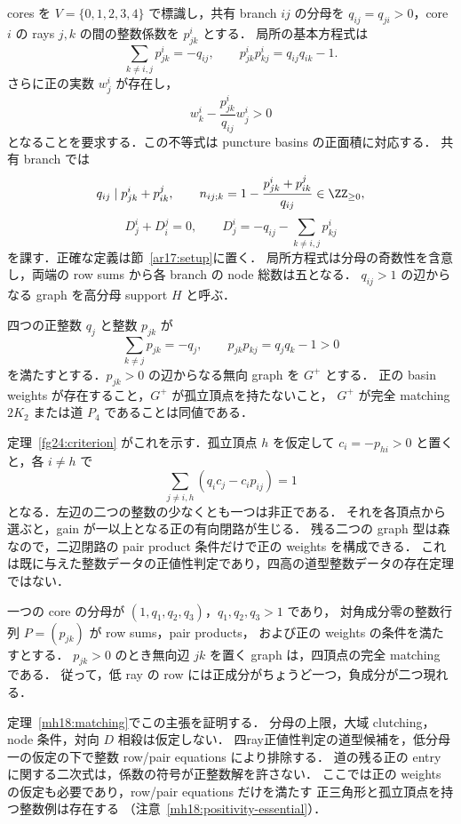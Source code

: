 cores を $V=\{0,1,2,3,4\}$ で標識し，共有 branch $ij$ の分母を
$q_{ij}=q_{ji}>0$，core $i$ の rays $j,k$ の間の整数係数を $p^i_{jk}$ とする．
局所の基本方程式は
\[
 \sum_{k\ne i,j}p^i_{jk}=-q_{ij},\qquad
 p^i_{jk}p^i_{kj}=q_{ij}q_{ik}-1.
\]
さらに正の実数 $w^i_j$ が存在し，
\[
 w^i_k-\frac{p^i_{jk}}{q_{ij}}w^i_j>0
\]
となることを要求する．この不等式は puncture basins の正面積に対応する．
共有 branch では
\[
 q_{ij}\mid p^i_{jk}+p^j_{ik},\qquad
 n_{ij;k}=1-\frac{p^i_{jk}+p^j_{ik}}{q_{ij}}\in\ZZ_{\ge0},
\]
\[
 D^i_j+D^j_i=0,\qquad
 D^i_j=-q_{ij}-\sum_{k\ne i,j}p^i_{kj}
\]
を課す．正確な定義は節~\ref{ar17:setup}に置く．
局所方程式は分母の奇数性を含意し，両端の row sums から各 branch の node 総数は五となる．
$q_{ij}>1$ の辺からなる graph を高分母 support $H$ と呼ぶ．

\begin{theorem}[四ray整数データの正値性判定]
\label{ar24:four-ray-positive}
四つの正整数 $q_j$ と整数 $p_{jk}$ が
\[
 \sum_{k\ne j}p_{jk}=-q_j,\qquad p_{jk}p_{kj}=q_jq_k-1>0
\]
を満たすとする．$p_{jk}>0$ の辺からなる無向 graph を $G^+$ とする．
正の basin weights が存在すること，$G^+$ が孤立頂点を持たないこと，
$G^+$ が完全 matching $2K_2$ または道 $P_4$ であることは同値である．
\end{theorem}

定理~\ref{fg24:criterion} がこれを示す．孤立頂点 $h$ を仮定して
$c_i=-p_{hi}>0$ と置くと，各 $i\ne h$ で
\[
 \sum_{j\ne i,h}(q_i c_j-c_i p_{ij})=1
\]
となる．左辺の二つの整数の少なくとも一つは非正である．
それを各頂点から選ぶと，gain が一以上となる正の有向閉路が生じる．
残る二つの graph 型は森なので，二辺閉路の pair product 条件だけで正の weights を構成できる．
これは既に与えた整数データの正値性判定であり，四高の道型整数データの存在定理ではない．

\begin{theorem}
\label{ar18:main-matching}
一つの core の分母が $(1,q_1,q_2,q_3)$，$q_1,q_2,q_3>1$ であり，
対角成分零の整数行列 $P=(p_{jk})$ が row sums，pair products，
および正の weights の条件を満たすとする．
$p_{jk}>0$ のとき無向辺 $jk$ を置く graph は，四頂点の完全 matching である．
従って，低 ray の row には正成分がちょうど一つ，負成分が二つ現れる．
\end{theorem}

定理~\ref{mh18:matching}でこの主張を証明する．
分母の上限，大域 clutching，node 条件，対向 $D$ 相殺は仮定しない．
四ray正値性判定の道型候補を，低分母一の仮定の下で整数 row/pair equations により排除する．
道の残る正の entry に関する二次式は，係数の符号が正整数解を許さない．
ここでは正の weights の仮定も必要であり，row/pair equations だけを満たす
正三角形と孤立頂点を持つ整数例は存在する
（注意~\ref{mh18:positivity-essential}）．

